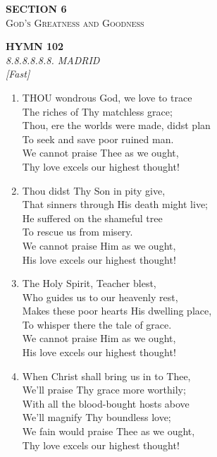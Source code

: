 \newpage
\thispagestyle{empty}
\vspace*{3.5cm}
\begin{center}
    {\LARGE \textbf{SECTION 6}}\\[0.8em]
    {\Large \textsc{God's Greatness and Goodness}}
\end{center}
\vspace{3.5cm}

\newpage
\begin{center}
    {\Large \textbf{HYMN 102}}
    \\
    \textit{8.8.8.8.8.8. MADRID}
    \\
    \textit{\small [Fast]}
\end{center}
\vspace{1em}

\begin{enumerate}
    \item THOU wondrous God, we love to trace \\
        The riches of Thy matchless grace; \\
        Thou, ere the worlds were made, didst plan \\
        To seek and save poor ruined man. \\
        We cannot praise Thee as we ought, \\
        Thy love excels our highest thought!

    \item Thou didst Thy Son in pity give, \\
        That sinners through His death might live; \\
        He suffered on the shameful tree \\
        To rescue us from misery. \\
        We cannot praise Him as we ought, \\
        His love excels our highest thought!

    \item The Holy Spirit, Teacher blest, \\
        Who guides us to our heavenly rest, \\
        Makes these poor hearts His dwelling place, \\
        To whisper there the tale of grace. \\
        We cannot praise Him as we ought, \\
        His love excels our highest thought!

    \item When Christ shall bring us in to Thee, \\
        We'll praise Thy grace more worthily; \\
        With all the blood-bought hosts above \\
        We'll magnify Thy boundless love; \\
        We fain would praise Thee as we ought, \\
        Thy love excels our highest thought!

\end{enumerate}

